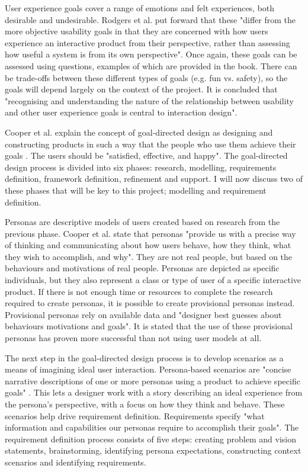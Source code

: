 \documentclass[authoryearcitations]{UoYCSproject}
\begin{document}
User experience goals cover a range of emotions and felt experiences, both desirable and undesirable. Rodgers et al. put forward that these "differ from the more objective usability goals in that they are concerned with how users experience an interactive product from their perspective, rather than assessing how useful a system is from its own perspective". Once again, these goals can be assessed using questions, examples of which are provided in the book. There can be trade-offs between these different types of goals (e.g. fun vs. safety), so the goals will depend largely on the context of the project. It is concluded that "recognising and understanding the nature of the relationship between usability and other user experience goals is central to interaction design". 

Cooper et al. explain the concept of goal-directed design as designing and constructing products in such a way that the people who use them achieve their goals \citep{Cooper2007}. The users should be "satisfied, effective, and happy". The goal-directed design process is divided into six phases: research, modelling, requirements definition, framework definition, refinement and support. I will now discuss two of these phases that will be key to this project; modelling and requirement definition. 

Personas are descriptive models of users created based on research from the previous phase. Cooper et al. state that personas "provide us with a precise way of thinking and communicating about how users behave, how they think, what they wish to accomplish, and why". They are not real people, but based on the behaviours and motivations of real people. Personas are depicted as specific individuals, but they also represent a class or type of user of a specific interactive product. If there is not enough time or resources to complete the research required to create personas, it is possible to create provisional personas instead. Provisional personas rely on available data and "designer best guesses about behaviours motivations and goals". It is stated that the use of these provisional personas has proven more successful than not using user models at all.

The next step in the goal-directed design process is to develop scenarios as a means of imagining ideal user interaction. Persona-based scenarios are "concise narrative descriptions of one or more personas using a product to achieve specific goals" \citep{Cooper2007}. This lets a designer work with a story describing an ideal experience from the persona's perspective, with a focus on how they think and behave. These scenarios help drive requirement definition. Requirements specify "what information and capabilities our personas require to accomplish their goals". The requirement definition process consists of five steps: creating problem and vision statements, brainstorming, identifying persona expectations, constructing context scenarios and identifying requirements.
\end{document}
